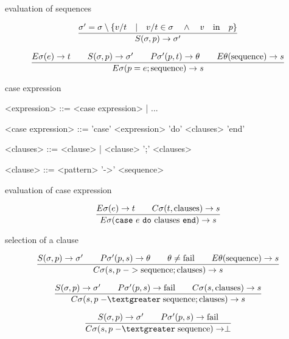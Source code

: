 \begin{frame}{evaluation of sequences}


$$\frac{\sigma' = \sigma \setminus \lbrace v/t \quad | \quad v/t \in \sigma \quad \wedge \quad  v \quad {\rm in} \quad p\rbrace}{S(\sigma, p) \rightarrow \sigma'}$$
  

$$\frac{   
  E\sigma(e) \rightarrow t
  \qquad S(\sigma, p) \rightarrow \sigma' 
  \qquad P\sigma'(p, t) \rightarrow \theta
  \qquad E\theta({\rm sequence}) \rightarrow s
}{E\sigma(p = e; {\rm sequence}) \rightarrow s}$$ 


\end{frame}


\begin{frame}{case expression}

\begin{grammar}
     <expression> ::=  <case expression> | ...  

     <case expression> ::= 'case' <expression> 'do' <clauses>  'end' 

     <clauses> ::=   <clause> | <clause> ';' <clauses>

     <clause> ::=  <pattern> '->' <sequence>
\end{grammar}
\end{frame}

\begin{frame}{evaluation of case expression}


$$\frac{E\sigma(e) \rightarrow t \qquad C\sigma(t, {\rm clauses}) \rightarrow s }{E\sigma({\tt case}\ e \ {\tt do}\ {\rm clauses} \ {\tt end}) \rightarrow s}$$
  
\end{frame}
\begin{frame}{selection of a clause}

$$\frac{
  S(\sigma, p) \rightarrow \sigma' \qquad
  P\sigma'(p, s) \rightarrow \theta \qquad
  \theta \not = {\rm fail} \qquad
  E\theta({\rm sequence}) \rightarrow s}{
C\sigma(s, p \;{\rm ->}\;    {\rm sequence} ; {\rm clauses}) \rightarrow s}$$

\vspace{10pt}

$$\frac{
  S(\sigma, p) \rightarrow \sigma'   \qquad
  P\sigma'(p, s) \rightarrow {\rm fail} \qquad
  C\sigma(s, {\rm clauses}) \rightarrow s}{
C\sigma(s, p \;{\rm -\textgreater}\;  {\rm sequence} ; {\rm clauses}) \rightarrow s}$$

\vspace{10pt}

$$\frac{
  S(\sigma, p) \rightarrow \sigma' \qquad
  P\sigma'(p, s) \rightarrow {\rm fail} }{
C\sigma(s, p \;{\rm -\textgreater}\;  {\rm sequence}) \rightarrow \perp}$$


\end{frame}





